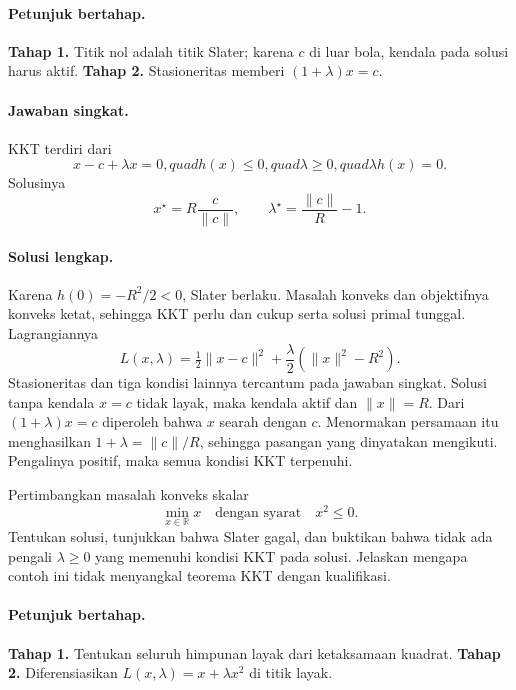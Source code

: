 \paragraph{Petunjuk bertahap.}
\label{orig03:midterm:hint:0005}
\textbf{Tahap 1.} Titik nol adalah titik Slater; karena $c$ di luar bola,
kendala pada solusi harus aktif.
\textbf{Tahap 2.} Stasioneritas memberi $(1+\lambda)x=c$.

\paragraph{Jawaban singkat.}
\label{orig03:midterm:answer:0005}
KKT terdiri dari
\[
 x-c+\lambda x=0,quad h(x)\le0,quad\lambda\ge0,quad\lambda h(x)=0.
\]
Solusinya
\[
 x^\star=R\frac{c}{\lVert c\rVert},
 \qquad \lambda^\star=\frac{\lVert c\rVert}{R}-1.
\]

\paragraph{Solusi lengkap.}
\label{orig03:midterm:solution:0005}
Karena $h(0)=-R^2/2<0$, Slater berlaku. Masalah konveks dan objektifnya
konveks ketat, sehingga KKT perlu dan cukup serta solusi primal tunggal.
Lagrangiannya
\[
 L(x,\lambda)=\tfrac12\lVert x-c\rVert^2
 +\frac\lambda2(\lVert x\rVert^2-R^2).
\]
Stasioneritas dan tiga kondisi lainnya tercantum pada jawaban singkat. Solusi
tanpa kendala $x=c$ tidak layak, maka kendala aktif dan
$\lVert x\rVert=R$. Dari $(1+\lambda)x=c$ diperoleh bahwa $x$ searah dengan
$c$. Menormakan persamaan itu menghasilkan
$1+\lambda=\lVert c\rVert/R$, sehingga pasangan yang dinyatakan mengikuti.
Pengalinya positif, maka semua kondisi KKT terpenuhi.

\begin{exercise}
\label{orig03:midterm:exercise:0006}
Pertimbangkan masalah konveks skalar
\[
 \min_{x\in\mathbb R} x
 \quad\text{dengan syarat}\quad x^2\le0.
\]
Tentukan solusi, tunjukkan bahwa Slater gagal, dan buktikan bahwa tidak ada
pengali $\lambda\ge0$ yang memenuhi kondisi KKT pada solusi. Jelaskan mengapa
contoh ini tidak menyangkal teorema KKT dengan kualifikasi.
\end{exercise}

\paragraph{Petunjuk bertahap.}
\label{orig03:midterm:hint:0006}
\textbf{Tahap 1.} Tentukan seluruh himpunan layak dari ketaksamaan kuadrat.
\textbf{Tahap 2.} Diferensiasikan $L(x,\lambda)=x+\lambda x^2$ di titik layak.

